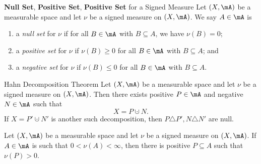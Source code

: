 \documentclass[pmath451]{subfiles}
\begin{document}
    \rruleline
    
    \begin{definition}{\textbf{Null Set}, \textbf{Positive Set}, \textbf{Positive Set} for a Signed Measure}
        Let $\left( X,\mA \right)$ be a measurable space and let $\nu$ be a signed measure on $\left( X,\mA \right)$. We say $A\in\mA$ is
        \begin{enumerate}
            \item a \emph{null set} for $\nu$ if for all $B\in\mA$ with $B\subseteq A$, we have $\nu\left( B \right) = 0$;
            \item a \emph{positive set} for $\nu$ if $\nu\left( B \right)\geq 0$ for all $B\in\mA$ with $B\subseteq A$; and
            \item a \emph{negative set} for $\nu$ if $\nu\left( B \right)\leq 0$ for all $B\in\mA$ with $B\subseteq A$. 
        \end{enumerate}
    \end{definition}
    
    \begin{theorem}{Hahn Decomposition Theorem}
        Let $\left( X,\mA \right)$ be a measurable space and let $\nu$ be a signed measure on $\left( X,\mA \right)$. 
        Then there exists positive $P\in\mA$ and negative $N\in\mA$ such that
        \begin{equation*}
            X = P\cupdot N.
        \end{equation*}
        If $X = P'\cupdot N'$ is another such decomposition, then $P\triangle P', N\triangle N'$ are null.
    \end{theorem}
    
    \placeqed[Postponed]

    \begin{lemma_inside}{}
        Let $\left( X,\mA \right)$ be a measurable space and let $\nu$ be a signed measure on $\left( X,\mA \right)$. If $A\in\mA$ is such that $0<\nu\left( A \right)<\infty$, then there is positive $P\subseteq A$ such that $\nu\left( P \right)>0$.
    \end{lemma_inside}
\end{document}
